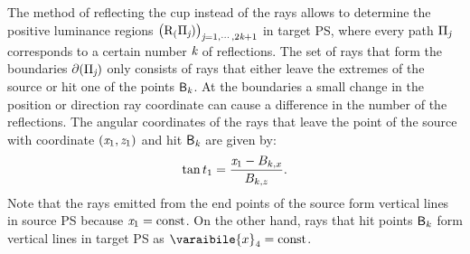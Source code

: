 The method of reflecting the cup instead of the rays allows to determine the positive luminance regions $\big(\mbox{$\textup{R}$}_(\Pi_{\textit{j}})\big)_{\textit{j}=1, \cdots, 2\textit{k}+1}$ in target PS, where every path $\Pi_{\textit{j}}$ corresponds to a certain number $\textit{k}$ of reflections. The set of rays that form the boundaries $\partial$$(\Pi_{\textit{j}})$ only consists of rays that either leave the extremes of the source or hit one of the points $\textsf{B}_{\textit{k}}$. At the boundaries a small change in the position or direction ray coordinate can cause a difference in the number of the reflections. The angular coordinates of the rays that leave the point of the source with coordinate $(\textit{x}_1, \textit{z}_1)$ and hit $\textsf{B}_{\textit{k}}$ are given by:
\begin{equation}\label{anglesource}
\tan t_1 = \frac{\textit{x}_1-B_{k,x}}{B_{k,z}}.
\end{equation}
Note that the rays emitted from the end points of the source form vertical lines in source PS  because $\textit{x}_1 = \textrm{const}$. On the other hand, rays that hit points $\textsf{B}_k$ form vertical lines in target PS  as $\varaibile{x}_4 = \textrm{const}$.

